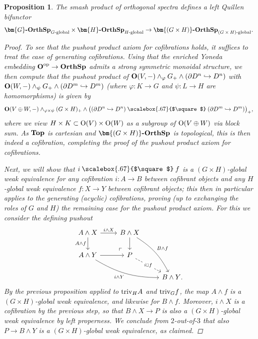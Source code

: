 \documentclass[reqno]{memo-l}
\theoremstyle{mythm}
\newtheorem{prop}[thm]{Proposition}
\theoremstyle{definition}
\numberwithin{equation}{section}
\renewcommand{\phi}{\varphi}
\newcommand{\ppo}{\mathbin{\raise.25pt\hbox{\scalebox{.67}{$\square$}}}}
\newcommand{\cat}[1]{\textbf{\textup{#1}}}
\newcommand{\op}{{\textup{op}}}
\newcommand{\triv}{{\textup{triv}}}
\renewcommand{\O}{{\textup{O}}}
\let\smashp=\wedge
\newcommand{\osp}{{\textbf{\textup{OrthSp}}}}
\newcommand{\Gosp}[1]{\cat{$\bm{#1}$-OrthSp}}
\begin{document}
\begin{prop}\label{prop:smash-gl-left-Quillen}
    The smash product of orthogonal spectra defines a left Quillen bifunctor 
    \[
        \Gosp{G}_\textup{$G$-global}\times\Gosp{H}_\textup{$H$-global}\to
        \Gosp{(G\times H)}_\textup{$(G\times H)$-global}.
    \]
    \begin{proof}
        To see that the pushout product axiom for cofibrations holds, it suffices to treat the case of generating cofibrations. Using that the enriched Yoneda embedding $\cat{O}^\op\to\osp$ admits a strong symmetric monoidal structure, we then compute that the pushout product of $\cat{O}(V,-)\smashp_{\phi} G_+\smashp (\partial D^n\hookrightarrow D^n)$ with $\cat{O}(W,-)\smashp_\psi G_+\smashp (\partial D^m\hookrightarrow D^m)$ (where $\phi\colon K\to G$ and $\psi\colon L\to H$ are homomorphisms) is given by
        \[
            \cat{O}(V\oplus W,-)\smashp_{\phi\times\psi}(G\times H)_+\smashp\big((\partial D^n\hookrightarrow D^n)\ppo(\partial D^m\hookrightarrow D^m)\big)_+,
        \]
        where we view $H\times K\subset \O(V)\times \O(W)$ as a subgroup of $\O(V\oplus W)$ via block sum. As $\cat{Top}$ is cartesian and $\Gosp{(G\times H)}$ is topological, this is then indeed a cofibration, completing the proof of the pushout product axiom for cofibrations.

        Next, we will show that $i\ppo f$ is a $(G\times H)$-global weak equivalence for any cofibration $i\colon A\to B$ between cofibrant objects and any $H$-global weak equivalence $f\colon X\to Y$ between cofibrant objects; this then in particular applies to the generating (acyclic) cofibrations, proving (up to exchanging the roles of $G$ and $H$) the remaining case for the pushout product axiom. For this we consider the defining pushout
        \[
            \begin{tikzcd}
                A\smashp X\arrow[r,"i\smashp X"]\arrow[d,"A\smashp f"']\arrow[dr,phantom,"\ulcorner"{very near end}] & B\smashp X\arrow[d]\arrow[ddr, bend left=15pt,"B\smashp f"]\\
                A\smashp Y\arrow[r]\arrow[drr, bend right=15pt,"i\smashp Y"'] & P\arrow[dr,dashed,"i\ppo f"{description}]\\
                && B\smashp Y\rlap.
            \end{tikzcd}
        \]
        By the previous proposition applied to $\triv_HA$ and $\triv_Gf$, the map $A\smashp f$ is a $(G\times H)$-global weak equivalence, and likewise for $B\smashp f$. Moreover, $i\smashp X$ is a cofibration by the previous step, so that $B\smashp X\to P$ is also a $(G\times H)$-global weak equivalence by left properness. We conclude from $2$-out-of-$3$ that also $P\to B\smashp Y$ is a $(G\times H)$-global weak equivalence, as claimed.
    \end{proof}
\end{prop}
\end{document}
